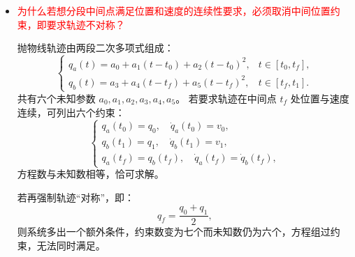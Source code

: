 \documentclass[../main.tex]{subfiles}
\begin{document}
\begin{enumerate}
\begin{enumerate}
{\begin{itemize}
             \( \left\{  \begin{array}{l} {q}_{a}\left( {t}_{0}\right)  = {a}_{0} = {q}_{0} \\  {\dot{q}}_{a}\left( {t}_{0}\right)  = {a}_{1} = {v}_{0} \\  {q}_{b}\left( {t}_{1}\right)  = {a}_{3} + {a}_{4}\left( {{t}_{1} - {t}_{f}}\right)  + {a}_{5}{\left( {t}_{1} - {t}_{f}\right) }^{2} = {q}_{1} \\  {\dot{q}}_{b}\left( {t}_{1}\right)  = {a}_{4} + 2{a}_{5}\left( {{t}_{1} - {t}_{f}}\right)  = {v}_{1} \\  {q}_{a}\left( {t}_{f}\right)  = {a}_{0} + {a}_{1}\left( {{t}_{1} - {t}_{f}}\right)  + {a}_{2}{\left( {t}_{1} - {t}_{f}\right) }^{2} = {a}_{3}\left( { = {q}_{b}\left( {t}_{f}\right) }\right. \\  \left. {{\dot{q}}_{a}\left( {t}_{f}\right)  = {a}_{1} + 2{a}_{2}\left( {{t}_{1} - {t}_{f}}\right) }\right)  = {a}_{4}\left( { = {\dot{q}}_{b}\left( {t}_{f}\right) }\right)  \end{array}\right. \)
            \\$t_f$ 作为自由变量，最后参数和其取值有关，根据最大加速度或任务约束优化确定。
            \\================================   
            \item \textcolor{red}{为什么若想分段中间点满足位置和速度的连续性要求，必须取消中间位置约束，即要求轨迹不对称？}
            
            {\small\kaishu
            抛物线轨迹由两段二次多项式组成：
            \[
            \begin{cases}
            q_a(t) = a_0 + a_1(t - t_0) + a_2(t - t_0)^2, & t\in[t_0, t_f],\\[4pt]
            q_b(t) = a_3 + a_4(t - t_f) + a_5(t - t_f)^2, & t\in[t_f, t_1].
            \end{cases}
            \]
            共有六个未知参数 $a_0,a_1,a_2,a_3,a_4,a_5$。  
            若要求轨迹在中间点 $t_f$ 处位置与速度连续，可列出六个约束：
            \[
            \begin{cases}
            q_a(t_0)=q_0, \quad \dot q_a(t_0)=v_0,\\
            q_b(t_1)=q_1, \quad \dot q_b(t_1)=v_1,\\
            q_a(t_f)=q_b(t_f), \quad \dot q_a(t_f)=\dot q_b(t_f),
            \end{cases}
            \]
            方程数与未知数相等，恰可求解。  
            
            若再强制轨迹“对称”，即：
            \[
            q_f=\frac{q_0+q_1}{2},
            \]
            则系统多出一个额外条件，约束数变为七个而未知数仍为六个，方程组过约束，无法同时满足。  
            
}
\end{itemize}}
\end{enumerate}
\end{enumerate}
\end{document}
